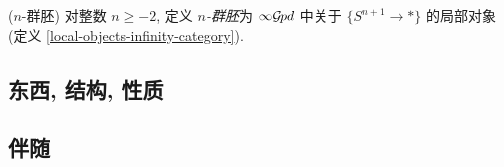 \begin{definition}
	{($n$-群胚)}
	对整数 $n\geq -2$, 定义 \emph{$n$-群胚}为 ${\infty\mathcal {G}\hspace{-1pt}pd}$ 中关于 $\{S^{n+1}\to *\}$ 的局部对象 (定义 \ref{local-objects-infinity-category}).
\end{definition}



\subsection{东西, 结构, 性质}

\subsection{伴随}


